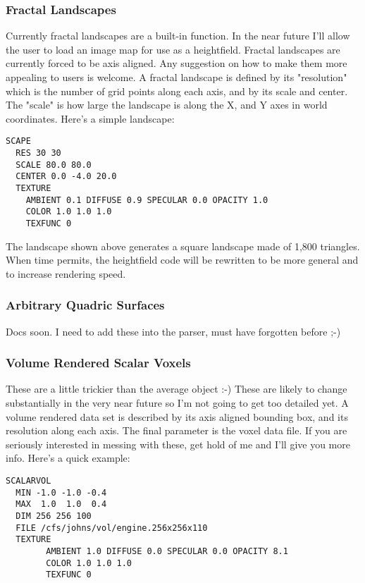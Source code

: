 \subsubsection{Fractal Landscapes}
  Currently fractal landscapes are a built-in function.  In the near future
I'll allow the user to load an image map for use as a heightfield.
Fractal landscapes are currently forced to be axis aligned.  Any suggestion
on how to make them more appealing to users is welcome.  A fractal landscape
is defined by its "resolution" which is the number of grid points along
each axis, and by its scale and center.  The "scale" is how large the
landscape is along the X, and Y axes in world coordinates.  Here's a simple
landscape:  
\begin{verbatim}
SCAPE
  RES 30 30
  SCALE 80.0 80.0
  CENTER 0.0 -4.0 20.0
  TEXTURE
    AMBIENT 0.1 DIFFUSE 0.9 SPECULAR 0.0 OPACITY 1.0
    COLOR 1.0 1.0 1.0
    TEXFUNC 0
\end{verbatim}
The landscape shown above generates a square landscape made of 1,800 triangles.
When time permits, the heightfield code will be rewritten to be more 
general and to increase rendering speed.

\subsubsection{Arbitrary Quadric Surfaces}
  Docs soon. I need to add these into the parser, must have forgotten
before ;-)   

\subsubsection{Volume Rendered Scalar Voxels}
  These are a little trickier than the average object :-)
These are likely to change substantially in the very near future so I'm not
going to get too detailed yet.
A volume rendered data set is described by its axis aligned bounding box, and 
its resolution along each axis.  The final parameter is the voxel data 
file.  If you are seriously interested in messing with these, get hold of
me and I'll give you more info.  Here's a quick example:
\begin{verbatim}
SCALARVOL
  MIN -1.0 -1.0 -0.4
  MAX  1.0  1.0  0.4
  DIM 256 256 100
  FILE /cfs/johns/vol/engine.256x256x110
  TEXTURE
        AMBIENT 1.0 DIFFUSE 0.0 SPECULAR 0.0 OPACITY 8.1
        COLOR 1.0 1.0 1.0
        TEXFUNC 0
\end{verbatim}

